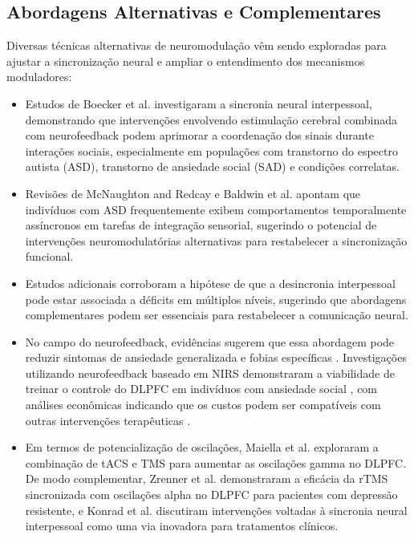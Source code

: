\subsection{Abordagens Alternativas e Complementares}
Diversas técnicas alternativas de neuromodulação vêm sendo exploradas para ajustar a sincronização neural e ampliar o entendimento dos mecanismos moduladores:
\begin{itemize}
    \item Estudos de Boecker et al. \cite{boecker2024interpersonal} investigaram a sincronia neural interpessoal, demonstrando que intervenções envolvendo estimulação cerebral combinada com neurofeedback podem aprimorar a coordenação dos sinais durante interações sociais, especialmente em populações com transtorno do espectro autista (ASD), transtorno de ansiedade social (SAD) e condições correlatas.
    \item Revisões de McNaughton and Redcay \cite{mcnaughton2020interpersonal} e Baldwin et al. \cite{baldwin2014evidence} apontam que indivíduos com ASD frequentemente exibem comportamentos temporalmente assíncronos em tarefas de integração sensorial, sugerindo o potencial de intervenções neuromodulatórias alternativas para restabelecer a sincronização funcional.
    \item Estudos adicionais \cite{gerloff2022autism, quinones2021dysfunction, key2022greater, tanabe2012hard} corroboram a hipótese de que a desincronia interpessoal pode estar associada a déficits em múltiplos níveis, sugerindo que abordagens complementares podem ser essenciais para restabelecer a comunicação neural.
    \item No campo do neurofeedback, evidências sugerem que essa abordagem pode reduzir sintomas de ansiedade generalizada e fobias específicas \cite{hou2021neurofeedback, zilverstand2015fmri}. Investigações utilizando neurofeedback baseado em NIRS demonstraram a viabilidade de treinar o controle do DLPFC em indivíduos com ansiedade social \cite{kimmig2019feasibility, direito2021training, steiner2014pilot, lamarca2018facilitating, catala2017treatment}, com análises econômicas indicando que os custos podem ser compatíveis com outras intervenções terapêuticas \cite{arnold2013eeg}.
    \item Em termos de potencialização de oscilações, Maiella et al. \cite{maiella2022simultaneous} exploraram a combinação de tACS e TMS para aumentar as oscilações gamma no DLPFC. De modo complementar, Zrenner et al. \cite{zrenner2020brain} demonstraram a eficácia da rTMS sincronizada com oscilações alpha no DLPFC para pacientes com depressão resistente, e Konrad et al. \cite{konrad2024interpersonal} discutiram intervenções voltadas à sincronia neural interpessoal como uma via inovadora para tratamentos clínicos.
\end{itemize}

